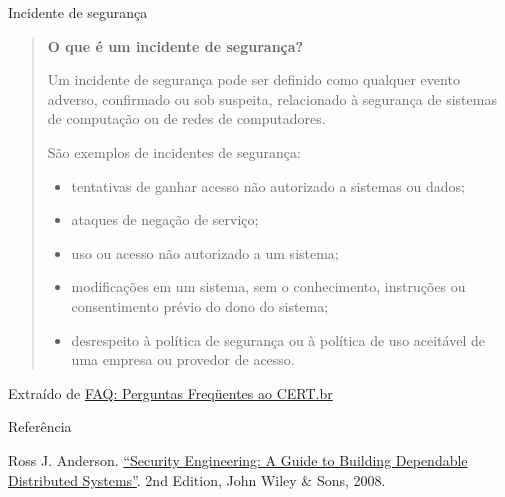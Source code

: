 \begin{frame}{Incidente de segurança}

\begin{quote}\footnotesize
{\bf O que é um incidente de segurança?}

Um incidente de segurança pode ser definido como qualquer evento
adverso, confirmado ou sob suspeita, relacionado à segurança de
sistemas de computação ou de redes de computadores.

São exemplos de incidentes de segurança:

\begin{itemize}[<+-| alert@+>]
\item tentativas de ganhar acesso não autorizado a sistemas ou dados;
\item ataques de negação de serviço;
\item uso ou acesso não autorizado a um sistema;
\item modificações em um sistema, sem o conhecimento, instruções ou consentimento prévio do dono do sistema;
\item desrespeito à política de segurança ou à política de uso aceitável de uma empresa ou provedor de acesso.
\end{itemize}

\end{quote}

\hfill Extraído de \href{http://www.cert.br/docs/certbr-faq.html\#6}{FAQ: Perguntas Freqüentes ao CERT.br}

\end{frame}

\begin{frame}[allowframebreaks]{Referência}

  \begin{thebibliography}{10}
    \beamertemplatebookbibitems
    Ross J. Anderson.
    \newblock \href{https://www.amazon.com.br/Security-Engineering-Building-Dependable-Distributed/dp/0470068523}{``Security Engineering: A Guide to Building
      Dependable Distributed Systems''}.
    \newblock 2nd Edition, John Wiley \& Sons, 2008.

  \end{thebibliography}

\end{frame}